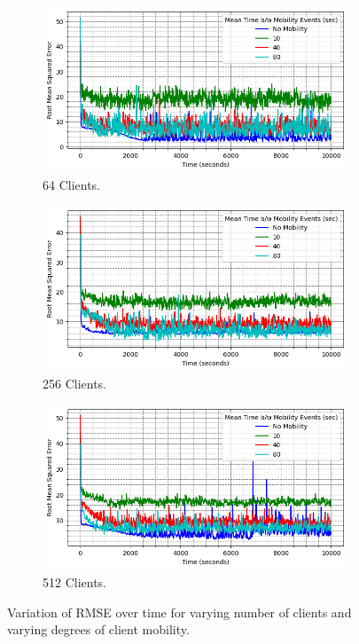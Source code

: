 \begin{figure}
\centering
\begin{subfigure}{0.48\textwidth}
  \centering
  \includegraphics[width=\linewidth]{figures/design_space/nw_prox/rmsre_vs_time_num_agents_64.png}
  \caption{64 Clients.}
  \label{fig:mobility_N_64}
\end{subfigure}
\begin{subfigure}{0.48\textwidth}
  \centering
  \includegraphics[width=\linewidth]{figures/design_space/nw_prox/rmsre_vs_time_num_agents_256.png}
  \caption{256 Clients.}
  \label{fig:mobility_N_256}
\end{subfigure}
\begin{subfigure}{0.48\textwidth}
  \centering
  \includegraphics[width=\linewidth]{figures/design_space/nw_prox/rmsre_vs_time_num_agents_512.png}
  \caption{512 Clients.}
  \label{fig:mobility_N_512}
\end{subfigure}
\caption{Variation of RMSE over time for varying number of clients and varying degrees of client mobility.}
\label{fig:mobility_nc_rmse}
\end{figure}
